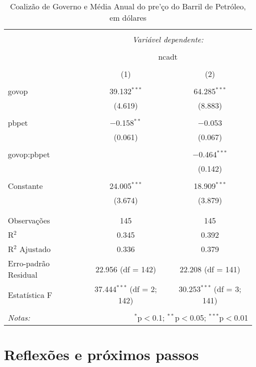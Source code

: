 \documentclass[
	article,			%
	11pt,				%
	oneside,			%
	a4paper,			%
	english,			%
	brazil,				%
	sumario=tradicional
	]{abntex2}
\begin{document}
\begin{table}[!htbp] \centering 
  \caption{Coalizão de Governo e Média Anual do pre'\c co do Barril de Petróleo, em dólares} 
  \label{} 
\begin{tabular}{@{\extracolsep{5pt}}lcc} 
\\[-1.8ex]\hline 
\hline \\[-1.8ex] 
 & \multicolumn{2}{c}{\textit{Variável dependente:}} \\ 
\cline{2-3} 
\\[-1.8ex] & \multicolumn{2}{c}{ncadt} \\ 
\\[-1.8ex] & (1) & (2)\\ 
\hline \\[-1.8ex] 
 govop & 39.132$^{***}$ & 64.285$^{***}$ \\ 
  & (4.619) & (8.883) \\ 
  & & \\ 
 pbpet & $-$0.158$^{**}$ & $-$0.053 \\ 
  & (0.061) & (0.067) \\ 
  & & \\ 
 govop:pbpet &  & $-$0.464$^{***}$ \\ 
  &  & (0.142) \\ 
  & & \\ 
 Constante & 24.005$^{***}$ & 18.909$^{***}$ \\ 
  & (3.674) & (3.879) \\ 
  & & \\ 
\hline \\[-1.8ex] 
Observações & 145 & 145 \\ 
R$^{2}$ & 0.345 & 0.392 \\ 
R$^{2}$ Ajustado & 0.336 & 0.379 \\ 
Erro-padrão Residual & 22.956 (df = 142) & 22.208 (df = 141) \\ 
Estatística F & 37.444$^{***}$ (df = 2; 142) & 30.253$^{***}$ (df = 3; 141) \\ 
\hline 
\hline \\[-1.8ex] 
\textit{Notas:}  & \multicolumn{2}{r}{$^{*}$p$<$0.1; $^{**}$p$<$0.05; $^{***}$p$<$0.01} \\ 
\end{tabular} 
\end{table} 


\section*{Reflexões e próximos passos}
\end{document}
